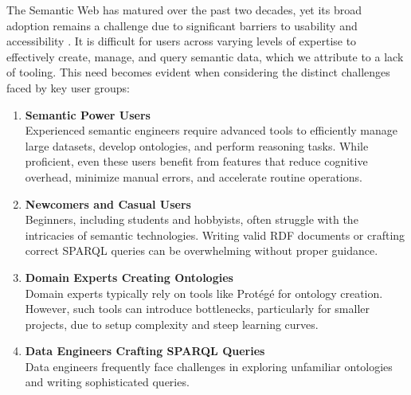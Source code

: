 The Semantic Web has matured over the past two decades, yet its broad adoption remains a challenge due to significant barriers to usability and accessibility \cite{10.3233/SW-190387}. 
It is difficult for users across varying levels of expertise to effectively create, manage, and query semantic data, which we attribute to a lack of tooling.
This need becomes evident when considering the distinct challenges faced by key user groups:

\begin{enumerate}
  \item \textbf{Semantic Power Users}\\
    Experienced semantic engineers require advanced tools to efficiently manage large datasets, develop ontologies, and perform reasoning tasks.
    While proficient, even these users benefit from features that reduce cognitive overhead, minimize manual errors, and accelerate routine operations.

  \item \textbf{Newcomers and Casual Users}\\
    Beginners, including students and hobbyists, often struggle with the intricacies of semantic technologies\cite{EvensteinSigalov2023,Turki2021RepresentingCI}. 
    Writing valid RDF documents or crafting correct SPARQL queries can be overwhelming without proper guidance. 

\item \textbf{Domain Experts Creating Ontologies}\\
    Domain experts typically rely on tools like Protégé for ontology creation. 
    However, such tools can introduce bottlenecks, particularly for smaller projects, due to setup complexity and steep learning curves. 

  \item \textbf{Data Engineers Crafting SPARQL Queries}\\
    Data engineers frequently face challenges in exploring unfamiliar ontologies and writing sophisticated queries. 
\end{enumerate}


